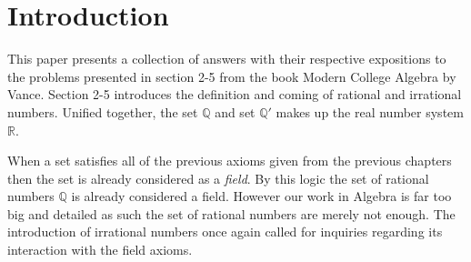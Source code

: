 \documentclass{article}
\begin{document}
\section{Introduction}  
This paper presents a collection of answers with their respective expositions to the problems 
presented in section 2-5 from the book Modern College Algebra by Vance. Section 2-5 introduces 
the definition and coming of rational and irrational numbers. Unified together, the set 
\(\mathbb{Q}\) and set \(\mathbb{Q}'\) makes up the real number system \(\mathbb{R}\). 

When a set satisfies all of the previous axioms given from the previous chapters then the set is already 
considered as a \emph{field}. By this logic the set of rational numbers \(\mathbb{Q}\) is already 
considered a field. However our work in Algebra is far too big and detailed as such the set of 
rational numbers are merely not enough. The introduction of irrational numbers once again called 
for inquiries regarding its interaction with the field axioms. 
\end{document}
